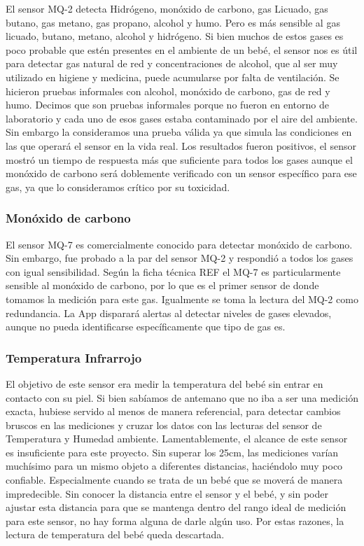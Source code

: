 \documentclass{IEEEtran}
\begin{document}
				El sensor MQ-2 detecta Hidrógeno, monóxido de carbono, gas Licuado, gas butano, gas metano, gas propano, alcohol y humo. Pero es más sensible al gas licuado, butano, metano, alcohol y hidrógeno. Si bien muchos de estos gases es poco probable que estén presentes en el ambiente de un bebé, el sensor nos es útil para detectar gas natural de red y concentraciones de alcohol, que al ser muy utilizado en higiene y medicina, puede acumularse por falta de ventilación.
				Se hicieron pruebas informales con alcohol, monóxido de carbono, gas de red y humo. Decimos que son pruebas informales porque no fueron en entorno de laboratorio y cada uno de esos gases estaba contaminado por el aire del ambiente. Sin embargo la consideramos una prueba válida ya que simula las condiciones en las que operará el sensor en la vida real. Los resultados fueron positivos, el sensor mostró un tiempo de respuesta más que suficiente para todos los gases aunque el monóxido de carbono será doblemente verificado con un sensor específico para ese gas, ya que lo consideramos crítico por su toxicidad.

			\subsubsection{Monóxido de carbono}

				El sensor MQ-7 es comercialmente conocido para detectar monóxido de carbono. Sin embargo, fue probado a la par del sensor MQ-2 y respondió a todos los gases con igual sensibilidad. 					Según la ficha técnica REF el MQ-7 es particularmente sensible al monóxido de carbono, por lo que es el primer sensor de donde tomamos la medición para este gas. Igualmente se toma la lectura del MQ-2 como redundancia. La App disparará alertas al detectar niveles de gases elevados, aunque no pueda identificarse específicamente que tipo de gas es.

			\subsubsection{Temperatura Infrarrojo}

				El objetivo de este sensor era medir la temperatura del bebé sin entrar en contacto con su piel. Si bien sabíamos de antemano que no iba a ser una medición exacta, hubiese servido al menos de manera referencial, para detectar cambios bruscos en las mediciones y cruzar los datos con las lecturas del sensor de Temperatura y Humedad ambiente.
				Lamentablemente, el alcance de este sensor es insuficiente para este proyecto. Sin superar los 25cm, las mediciones varían muchísimo para un mismo objeto a diferentes distancias, haciéndolo muy poco confiable. Especialmente cuando se trata de un bebé que se moverá de manera impredecible.
				Sin conocer la distancia entre el sensor y el bebé, y sin poder ajustar esta distancia para que se mantenga dentro del rango ideal de medición para este sensor, no hay forma alguna de darle algún uso.
				Por estas razones, la lectura de temperatura del bebé queda descartada.
\end{document}
